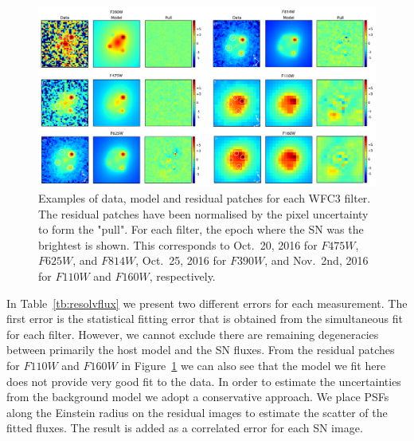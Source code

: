 \documentclass[a4paper,fleqn,usenatbib]{mnras}
\newcommand{\sn}{SN\xspace}
\newcommand{\wfc}{WFC3\xspace}
\newcommand{\wfcuvis}{WFC3/UVIS\xspace}
\newcommand{\wfcir}{WFC3/IR\xspace}
\newcommand{\jband}{{\it J}\xspace}
\newcommand{\hstu}{$F390W$\xspace}
\newcommand{\hstb}{$F475W$\xspace}
\newcommand{\hstr}{$F625W$\xspace}
\newcommand{\hsti}{$F814W$\xspace}
\newcommand{\hstj}{$F110W$\xspace}
\newcommand{\hsth}{$F160W$\xspace}
\begin{document}
\begin{figure}
	\centering
	\caption{%
		Examples of data, model and residual patches for each \wfc filter.  The residual patches have been normalised by the 
		pixel uncertainty to form the "pull".  For each filter, the epoch where the \sn was the brightest is shown.  This corresponds
		to Oct.~20, 2016 for \hstb, \hstr, and \hsti, Oct.~25, 2016 for \hstu, and Nov.~2nd, 2016 for \hstj and \hsth, respectively.
	\label{fig:wfcforward}}
	\includegraphics[width=\textwidth]{wfc3_patches_v2.pdf}
\end{figure}

%  

In Table~\ref{tb:resolvflux} we present two different errors for each measurement.  The first error is the statistical fitting error that is obtained 
from the simultaneous fit for each filter.  However, we cannot exclude there are remaining degeneracies between primarily the host model
and the \sn fluxes.  From the residual patches for \hstj and \hsth in Figure~\ref{fig:wfcforward} we can also see that the model we fit
here does not provide very good fit to the data.  In order to estimate the uncertainties from the background model we adopt a conservative
approach.  We place PSFs along the Einstein radius on the residual images to estimate the scatter of the fitted fluxes.  The result is added
as a correlated error for each \sn image.
\end{document}
